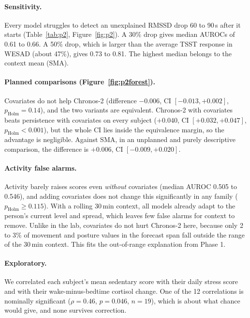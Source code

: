 \documentclass[11pt,a4paper]{article}
\begin{document}
\paragraph{Sensitivity.} Every model struggles to detect an unexplained RMSSD drop 60 to 90\,s after it starts (Table~\ref{tab:p2}, Figure~\ref{fig:p2}). A 30\% drop gives median AUROCs of 0.61 to 0.66. A 50\% drop, which is larger than the average TSST response in WESAD (about 47\%), gives 0.73 to 0.81. The highest median belongs to the context mean (SMA).

\paragraph{Planned comparisons (Figure~\ref{fig:p2forest}).} Covariates do not help Chronos-2 (difference $-0.006$, CI $[-0.013, +0.002]$, $p_\text{Holm}=0.14$), and the two variants are equivalent. Chronos-2 with covariates beats persistence with covariates on every subject ($+0.040$, CI $[+0.032, +0.047]$, $p_\text{Holm}<0.001$), but the whole CI lies inside the equivalence margin, so the advantage is negligible. Against SMA, in an unplanned and purely descriptive comparison, the difference is $+0.006$, CI $[-0.009, +0.020]$.

\paragraph{Activity false alarms.} Activity barely raises scores even \emph{without} covariates (median AUROC 0.505 to 0.546), and adding covariates does not change this significantly in any family ($p_\text{Holm}\geq0.115$). With a rolling 30\,min context, all models already adapt to the person's current level and spread, which leaves few false alarms for context to remove. Unlike in the lab, covariates do not hurt Chronos-2 here, because only 2 to 3\% of movement and posture values in the forecast span fall outside the range of the 30\,min context. This fits the out-of-range explanation from Phase 1.

\paragraph{Exploratory.} We correlated each subject's mean sedentary score with their daily stress score and with their wake-minus-bedtime cortisol change. One of the 12 correlations is nominally significant ($\rho=0.46$, $p=0.046$, $n=19$), which is about what chance would give, and none survives correction.
\end{document}
